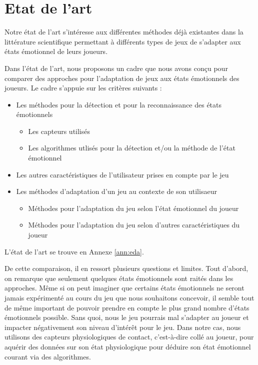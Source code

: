 \documentclass{article}
\begin{document}
\section{Etat de l'art}
	Notre état de l'art s'intéresse aux différentes méthodes déjà existantes dans la littérature scientifique permettant à différents types de jeux de s'adapter aux états émotionnel de leurs joueurs.\par
	Dans l'état de l'art, nous proposons un cadre que nous avons conçu pour comparer des approches pour l'adaptation de jeux aux états émotionnels des joueurs. Le cadre s'appuie sur les critères suivants :
	\begin{itemize}
		\item Les méthodes pour la détection et pour la reconnaissance des états émotionnels
		\begin{itemize}
			\item Les capteurs utilisés
			\item Les algorithmes utlisés pour la détection et/ou la méthode de l'état émotionnel
		\end{itemize}
		\item Les autres caractéristiques de l'utilisateur prises en compte par le jeu
		\item Les méthodes d'adaptation d'un jeu au contexte de son utilisaeur
		\begin{itemize}
			\item Méthodes pour l'adaptation du jeu selon l'état émotionnel du joueur
			\item Méthodes pour l'adaptation du jeu selon d'autres caractéristiques du joueur
		\end{itemize}
	\end{itemize}
	L'état de l'art se trouve en Annexe \ref{ann:eda}.\par
	De cette comparaison, il en ressort plusieurs questions et limites.
	Tout d'abord, on remarque que seulement quelques états émotionnels sont raités dans les approches. 
	Même si on peut imaginer que certains états émotionnels ne seront jamais expérimenté au cours du jeu que nous souhaitons concevoir, il semble tout de même important de pouvoir prendre en compte le plus grand nombre d'états émotionnels possible.
	Sans quoi, nous le jeu pourrais mal s'adapter au joueur et impacter négativement son niveau d'intérêt pour le jeu.
	Dans notre cas, nous utilisons des capteurs physiologiques de contact, c'est-à-dire collé au joueur, pour aquérir des données sur son état physiologique pour déduire son état émotionnel courant via des algorithmes.\par
\end{document}
